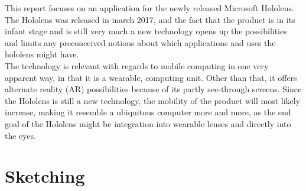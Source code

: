 \documentclass[11pt]{article}
\begin{document}
This report focuses on an application for the newly released Microsoft Hololens. The Hololens was released in march 2017, and the fact that the product is in its infant stage and is still very much a new technology opens up the possibilities and limits any preconceived notions about which applications and uses the hololens might have.\\
The technology is relevant with regards to mobile computing in one very apparent way, in that it is a wearable, computing unit. Other than that, it offers alternate reality (AR) possibilities because of its partly see-through screens. Since the Hololens is still a new technology, the mobility of the product will most likely increase, making it resemble a ubiquitous computer more and more, as the end goal of the Hololens might be integration into wearable lenses and directly into the eyes. 

\section{Sketching}

\end{document}

